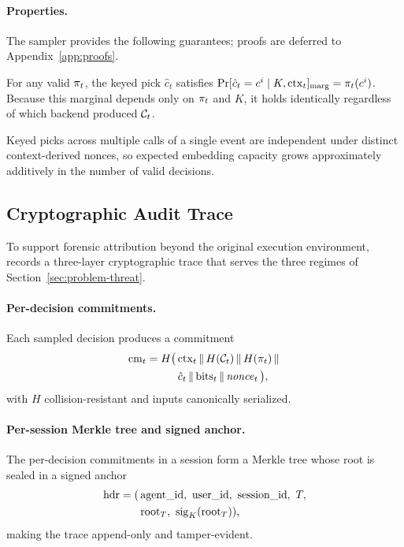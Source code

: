 \paragraph{Properties.}
The sampler provides the following guarantees; proofs are deferred to
Appendix~\ref{app:proofs}.

\begin{lemma}
\label{lem:dist-preserve}
For any valid $\pi_t$, the keyed pick $\hat c_t$ satisfies
$\Pr[\hat c_t=c^i\mid K,\mathrm{ctx}_t]_{\mathrm{marg}}=\pi_t(c^i)$.
Because this marginal depends only on $\pi_t$ and $K$, it holds
identically regardless of which backend produced $\mathcal{C}_t$.
\end{lemma}

\begin{lemma}
\label{lem:cascade}
Keyed picks across multiple calls of a single event are independent
under distinct context-derived nonces, so expected embedding capacity
grows approximately additively in the number of valid decisions.
\end{lemma}


\subsection{Cryptographic Audit Trace}
\label{sec:method-audit}
To support forensic attribution beyond the original execution
environment, \memmark{} records a three-layer cryptographic trace that
serves the three regimes of Section~\ref{sec:problem-threat}.

\paragraph{Per-decision commitments.}
Each sampled decision produces a commitment
\[
\begin{aligned}
\mathrm{cm}_t = H\big(\,
& \mathrm{ctx}_t \,\|\, H(\mathcal{C}_t) \,\|\, H(\pi_t) \,\|\, \\
& \hat c_t \,\|\, \text{bits}_t \,\|\, \mathit{nonce}_t \,\big),
\end{aligned}
\]
with $H$ collision-resistant and inputs canonically serialized.

\paragraph{Per-session Merkle tree and signed anchor.}
The per-decision commitments in a session form a Merkle tree whose root
is sealed in a signed anchor
\[
\begin{aligned}
\header = (\,&\text{agent\_id},\ \text{user\_id},\ \text{session\_id},\ T,\\
            &\text{root}_T,\ \mathrm{sig}_K(\text{root}_T)),
\end{aligned}
\]
making the trace append-only and tamper-evident.

